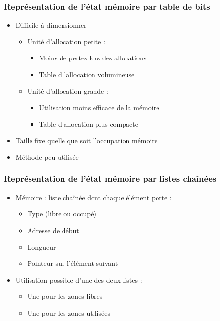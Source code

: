 \begin{frame}
\frametitle{Représentation de l'état mémoire par table de bits}
\begin{itemize}
\item Difficile à dimensionner
\begin{itemize}
\item Unité d’allocation petite :
\begin{itemize}
\item Moins de pertes lors des allocations
\item Table d ’allocation volumineuse
\end{itemize}
\item Unité d'allocation grande :
\begin{itemize}
\item Utilisation moins efficace de la mémoire
\item Table d'allocation plus compacte
\end{itemize}
\end{itemize}
\item Taille fixe quelle que soit l’occupation mémoire
\item Méthode peu utilisée
\end{itemize}
\end{frame}


\begin{frame}
\frametitle{Représentation de l'état mémoire par listes chaînées}
\begin{itemize}
\item Mémoire : liste chaînée dont chaque élément porte :
\begin{itemize}
\item Type (libre ou occupé)
\item Adresse de début
\item Longueur
\item Pointeur sur l’élément suivant
\end{itemize}
\item Utilisation possible d'une des deux listes :
\begin{itemize}
\item Une pour les zones libres
\item Une pour les zones utilisées
\end{itemize}
\end{itemize}
\end{frame}


